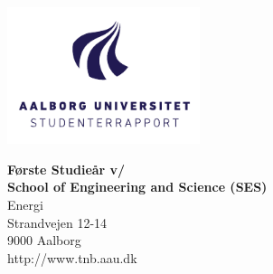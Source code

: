 

\thispagestyle{empty}

\begin{minipage}[t]{0.48\textwidth}
\vspace*{-25pt}			%
\includegraphics[height=4cm]{billeder/AAU-logo-stud-DK-RGB}
\end{minipage}
\hfill
\begin{minipage}[t]{0.48\textwidth}
{\small 
\textbf{Første Studieår v/ }\\
\textbf{School of Engineering and Science (SES)}  \\
Energi \\
Strandvejen 12-14 \\
9000 Aalborg \\
http://www.tnb.aau.dk}
\end{minipage}

\vspace*{0.2cm}

